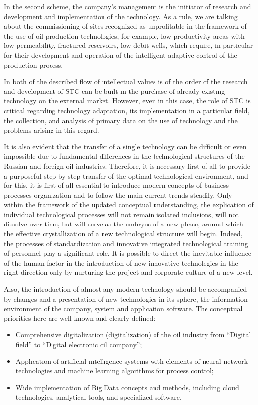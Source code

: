 \documentclass[12pt]{report}
\theoremstyle{definition}
\providecommand{\tightlist}{%
	\setlength{\itemsep}{0pt}\setlength{\parskip}{0pt}}
\begin{document}
In the second scheme, the company's management is the initiator of research and development and implementation of the technology.
As a rule, we are talking about the commissioning of sites recognized as unprofitable in the framework of the use of oil production technologies, for example, low-productivity areas with low permeability, fractured reservoirs, low-debit wells, which require, in particular for their development and operation of the intelligent adaptive control of the production process.

In both of the described flow of intellectual values is of the order of the research and development of STC can be built in the purchase of already existing technology on the external market.
However, even in this case, the role of STC is critical regarding technology adaptation, its implementation in a particular field, the collection, and analysis of primary data on the use of technology and the problems arising in this regard.

It is also evident that the transfer of a single technology can be difficult or even impossible due to fundamental differences in the technological structures of the Russian and foreign oil industries.
Therefore, it is necessary first of all to provide a purposeful step-by-step transfer of the optimal technological environment, and for this, it is first of all essential to introduce modern concepts of business processes organization and to follow the main current trends steadily.
Only within the framework of the updated conceptual understanding, the explication of individual technological processes will not remain isolated inclusions, will not dissolve over time, but will serve as the embryos of a new phase, around which the effective crystallization of a new technological structure will begin.
Indeed, the processes of standardization and innovative integrated technological training of personnel play a significant role.
It is possible to direct the inevitable influence of the human factor in the introduction of new innovative technologies in the right direction only by nurturing the project and corporate culture of a new level.

Also, the introduction of almost any modern technology should be accompanied by changes and a presentation of new technologies in its sphere, the information environment of the company, system and application software.
The conceptual priorities here are well known and clearly defined:
\begin{itemize} 
	\tightlist 
	\item Comprehensive digitalization (digitalization) of the oil industry from ``Digital field'' to ``Digital electronic oil company'';
	\item Application of artificial intelligence systems with elements of neural network technologies and machine learning algorithms for process control; 
	\item Wide implementation of Big Data concepts and methods, including cloud technologies, analytical tools, and specialized software.
\end{itemize}
\end{document}

